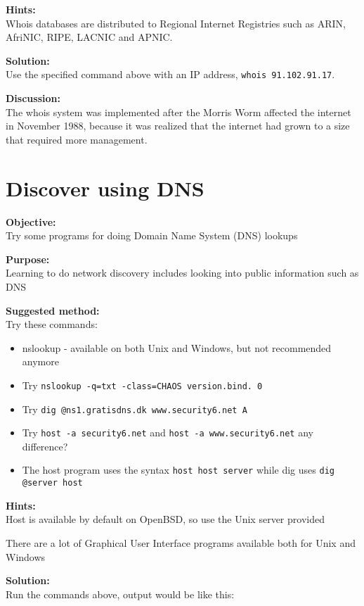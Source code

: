 \documentclass[a4paper,11pt,notitlepage]{report}
\begin{document}
{\bf Hints:}\\
Whois databases are distributed to Regional Internet Registries such as ARIN, AfriNIC, RIPE, LACNIC and APNIC.

{\bf Solution:}\\
Use the specified command above with an IP address, \verb+whois 91.102.91.17+.

{\bf Discussion:}\\
The whois system was implemented after the Morris Worm affected the internet in November 1988, because it was realized that the internet had grown to a size that required more management.


\chapter{Discover using DNS}
\label{ex:basic-dns-lookup}

{\bf Objective:}\\
Try some programs for doing Domain Name System (DNS) lookups

{\bf Purpose:}\\
Learning to do network discovery includes looking into public information such as DNS

{\bf Suggested method:}\\

Try these commands:
\begin{itemize}
\item nslookup - available on both Unix and Windows, but not recommended anymore
\item Try \verb+nslookup -q=txt -class=CHAOS version.bind. 0+
\item Try \verb+dig @ns1.gratisdns.dk www.security6.net A+
\item Try \verb+host -a security6.net+ and
\verb+host -a www.security6.net+ any difference?
\\
\item The host program uses the syntax \verb+host host server+ while dig uses \verb+dig @server host+
\end{itemize}

{\bf Hints:}\\
Host is available by default on OpenBSD, so use the Unix server provided

There are a lot of Graphical User Interface programs available both for Unix and Windows

{\bf Solution:}\\
Run the commands above, output would be like this:
\end{document}

